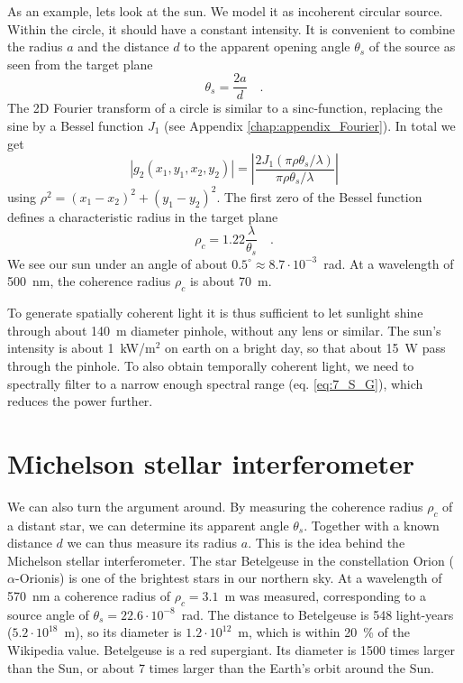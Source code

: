 As an example, lets look at the sun. We model it as incoherent circular source. Within the circle, it should have a constant intensity. It is  convenient to combine the radius $a$ and the distance $d$ to the apparent opening angle $\theta_s$ of the source as seen from the target plane
\begin{equation}
    \theta_s = \frac{2a}{d}  \quad .
\end{equation}
The 2D Fourier transform of a circle is similar to a sinc-function, replacing the sine by a Bessel function  $J_1$ (see Appendix \ref{chap:appendix_Fourier}). In total we get
\begin{equation}
    \left| g_2(x_1, y_1, x_2, y_2) \right| = \left|  
 \frac{2 J_1( \pi \rho \theta_s / \lambda)}{\pi \rho \theta_s / \lambda}
    \right|
\end{equation}
using $\rho^2 = (x_1-x_2)^2 + (y_1-y_2)^2$. The first zero of the Bessel function defines a characteristic radius in the target plane
\begin{equation}
    \rho_c = 1.22 \frac{\lambda}{\theta_s}  \quad .
\end{equation}
We see our sun under an angle of about $0.5^\circ \approx 8.7 \cdot 10^{-3}$~rad. At a wavelength of 500~nm, the coherence radius $ \rho_c$ is about 70~\textmu m.

To generate spatially coherent light it is thus sufficient to let sunlight shine through about 140~\textmu m diameter pinhole, without any lens or similar. The sun's intensity is about 1~kW/m$^2$ on earth on a bright day, so that about 15~\textmu W pass through the pinhole. To also obtain temporally coherent light, we need to spectrally filter to a narrow enough spectral range (eq. \ref{eq:7_S_G}), which reduces the power further.


\section{Michelson stellar interferometer}

We can also turn the argument around. By measuring the coherence radius $\rho_c$ of a distant star, we can determine its apparent angle $\theta_s$. Together with a known distance $d$ we can thus measure its radius $a$. This is the idea behind the Michelson stellar interferometer. The star Betelgeuse in the constellation Orion ($\alpha$-Orionis) is one of the brightest stars in our northern sky.  At a wavelength of 570~nm  a coherence radius of $\rho_c = 3.1$~m was measured, corresponding to a source angle of $\theta_s = 22.6 \cdot 10^{-8}$~rad. The distance to Betelgeuse is 548 light-years ($5.2 \cdot 10^{18}$~m), so its diameter is $1.2 \cdot 10^{12}$~m, which is within 20~\% of the Wikipedia value. Betelgeuse is a red supergiant. Its diameter is 1500 times larger than the Sun, or about 7 times larger than the Earth's orbit around the Sun.

